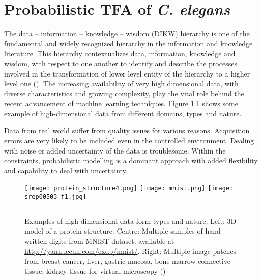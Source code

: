 
\chapter{Probabilistic TFA of \textit{C. elegans}}\label{ch:Probabilistic_TFA}

\ifpdf
    \graphicspath{{Chapter2/Figs/Raster/}{Chapter2/Figs/PDF/}{Chapter2/Figs/}}
\else
    \graphicspath{{Chapter2/Figs/Vector/}{Chapter2/Figs/}}
\fi

The data – information – knowledge – wisdom (DIKW) hierarchy is one of the fundamental and widely recognized hierarchy in the information and knowledge literature. This hierarchy contextualizes data, information, knowledge and wisdom, with respect to one another to identify and describe the processes involved in the transformation of lower level entity of the hierarchy to a higher level one (\cite{Rowley:2007}). The increasing availability of very high dimensional data, with diverse characteristics and growing complexity, play the vital role behind the recent advancement of machine learning techniques. Figure \ref{fig:High_dimensional_data} shows some example of high-dimensional data from different domains, types and nature.
 
Data from real world suffer from quality issues for various reasons. Acquisition errors are very likely to be included even in the controlled environment. Dealing with noise or added uncertainty of the data is troublesome. Within the constraints, probabilistic modelling is a dominant approach with added flexibility and capability to deal with uncertainty.

\begin{figure}
	\centering
		\texttt{[image: protein\_structure4.png]}
		\texttt{[image: mnist.png]}
		\texttt{[image: srep00503-f1.jpg]}
		\rule{35em}{0.5pt}
	\caption[Examples of high dimensional data form types and nature]
		{Examples of high dimensional data form types and nature. Left: 3D model of a 
		protein structure. Centre: Multiple samples of hand written digits from MNIST dataset. available at \url{http://yann.lecun.com/exdb/mnist/}. Right: Multiple image patches from breast cancer, liver, gastric mucosa, bone marrow connective tissue, kidney tissue for virtual microscopy (\cite{Wienert:2012}) }
	\label{fig:High_dimensional_data}
\end{figure}

